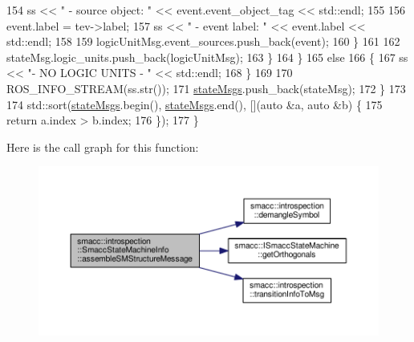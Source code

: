 \begin{DoxyCode}
154                     ss << \textcolor{stringliteral}{"                 - source object: "} << \textcolor{keyword}{event}.event\_object\_tag << std::endl;
155 
156                     \textcolor{keyword}{event}.label = tev->label;
157                     ss << \textcolor{stringliteral}{"                 - event label: "} << \textcolor{keyword}{event}.label << std::endl;
158 
159                     logicUnitMsg.event\_sources.push\_back(event);
160                 \}
161 
162                 stateMsg.logic\_units.push\_back(logicUnitMsg);
163             \}
164         \}
165         \textcolor{keywordflow}{else}
166         \{
167             ss << \textcolor{stringliteral}{"- NO LOGIC UNITS - "} << std::endl;
168         \}
169 
170         ROS\_INFO\_STREAM(ss.str());
171         \hyperlink{classsmacc_1_1introspection_1_1SmaccStateMachineInfo_a48e3ff7bbe2673d23e6942234446ebee}{stateMsgs}.push\_back(stateMsg);
172     \}
173 
174     std::sort(\hyperlink{classsmacc_1_1introspection_1_1SmaccStateMachineInfo_a48e3ff7bbe2673d23e6942234446ebee}{stateMsgs}.begin(), \hyperlink{classsmacc_1_1introspection_1_1SmaccStateMachineInfo_a48e3ff7bbe2673d23e6942234446ebee}{stateMsgs}.end(), [](\textcolor{keyword}{auto} &a, \textcolor{keyword}{auto} &b) \{
175         \textcolor{keywordflow}{return} a.index > b.index;
176     \});
177 \}
\end{DoxyCode}


Here is the call graph for this function\+:\nopagebreak
\begin{figure}[H]
\begin{center}
\leavevmode
\includegraphics[width=350pt]{classsmacc_1_1introspection_1_1SmaccStateMachineInfo_a6758065a8d1faaa7c3688cf0dffe9334_cgraph}
\end{center}
\end{figure}




